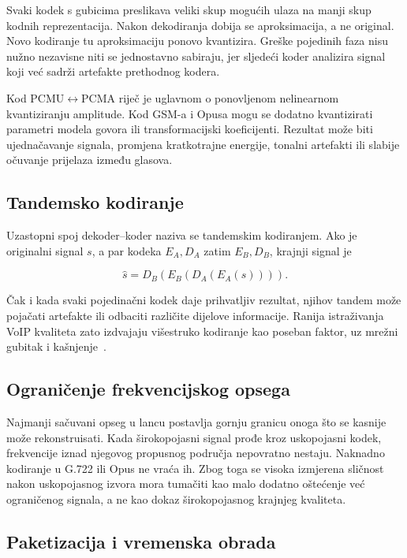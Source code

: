 Svaki kodek s gubicima preslikava veliki skup mogućih ulaza na manji skup kodnih reprezentacija. Nakon dekodiranja dobija se aproksimacija, a ne original. Novo kodiranje tu aproksimaciju ponovo kvantizira. Greške pojedinih faza nisu nužno nezavisne niti se jednostavno sabiraju, jer sljedeći koder analizira signal koji već sadrži artefakte prethodnog kodera.

Kod PCMU$\leftrightarrow$PCMA riječ je uglavnom o ponovljenom nelinearnom kvantiziranju amplitude. Kod GSM-a i Opusa mogu se dodatno kvantizirati parametri modela govora ili transformacijski koeficijenti. Rezultat može biti ujednačavanje signala, promjena kratkotrajne energije, tonalni artefakti ili slabije očuvanje prijelaza između glasova.

\subsection{Tandemsko kodiranje}

Uzastopni spoj dekoder--koder naziva se tandemskim kodiranjem. Ako je originalni signal $s$, a par kodeka $E_A,D_A$ zatim $E_B,D_B$, krajnji signal je

\begin{equation}
\widehat{s}=D_B\!\left(E_B\!\left(D_A\!\left(E_A(s)\right)\right)\right).
\end{equation}

Čak i kada svaki pojedinačni kodek daje prihvatljiv rezultat, njihov tandem može pojačati artefakte ili odbaciti različite dijelove informacije. Ranija istraživanja VoIP kvaliteta zato izdvajaju višestruko kodiranje kao poseban faktor, uz mrežni gubitak i kašnjenje~\cite{tandem-encoding,sun-voip-models}.

\subsection{Ograničenje frekvencijskog opsega}

Najmanji sačuvani opseg u lancu postavlja gornju granicu onoga što se kasnije može rekonstruisati. Kada širokopojasni signal prođe kroz uskopojasni kodek, frekvencije iznad njegovog propusnog područja nepovratno nestaju. Naknadno kodiranje u G.722 ili Opus ne vraća ih. Zbog toga se visoka izmjerena sličnost nakon uskopojasnog izvora mora tumačiti kao malo dodatno oštećenje već ograničenog signala, a ne kao dokaz širokopojasnog krajnjeg kvaliteta.

\subsection{Paketizacija i vremenska obrada}

